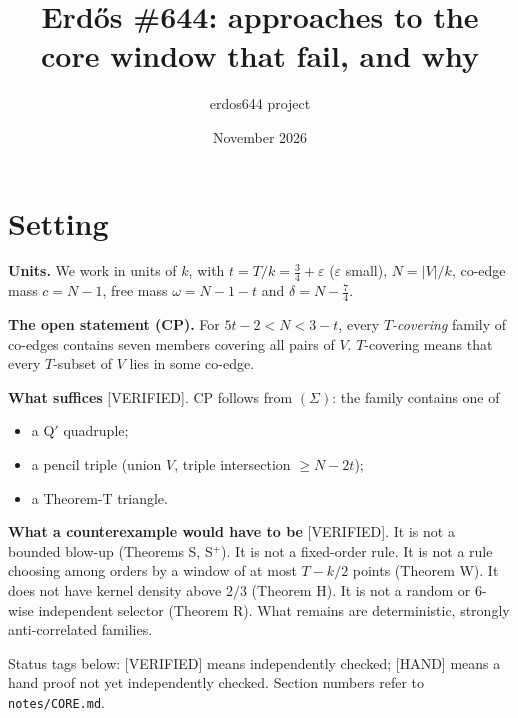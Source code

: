 \documentclass[11pt]{article}
\title{Erd\H{o}s \#644: approaches to the core window that fail, and why}
\author{erdos644 project}
\date{November 2026}
\newcommand{\lvl}[1]{\textsf{\small[#1]}}
\begin{document}
\maketitle
\vspace{-1em}
\section*{Setting}
\textbf{Units.} We work in units of $k$, with $t=T/k=\tfrac34+\varepsilon$ ($\varepsilon$ small), $N=|V|/k$, co-edge mass
$c=N-1$, free mass $\omega=N-1-t$ and $\delta=N-\tfrac74$.

\textbf{The open statement (CP).} For $5t-2<N<3-t$, every \emph{$T$-covering} family of co-edges contains seven members
covering all pairs of $V$. $T$-covering means that every $T$-subset of $V$ lies in some co-edge.

\textbf{What suffices} \lvl{VERIFIED}. CP follows from $(\Sigma)$: the family contains one of
\begin{itemize}
\item a Q$'$ quadruple;
\item a pencil triple (union $V$, triple intersection $\ge N-2t$);
\item a Theorem-T triangle.
\end{itemize}

\textbf{What a counterexample would have to be} \lvl{VERIFIED}. It is not a bounded blow-up (Theorems S, S$^+$). It is
not a fixed-order rule. It is not a rule choosing among orders by a window of at most $T-k/2$ points (Theorem W). It
does not have kernel density above $2/3$ (Theorem H). It is not a random or 6-wise independent selector (Theorem R).
What remains are deterministic, strongly anti-correlated families.

Status tags below: \lvl{VERIFIED} means independently checked; \lvl{HAND} means a hand proof not yet independently
checked. Section numbers refer to \texttt{notes/CORE.md}.
\end{document}
